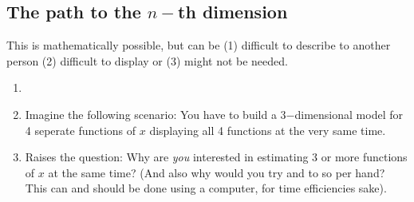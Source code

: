 \documentclass{article}
\begin{document}
\subsection{The path to the $n-$th dimension}
This is mathematically possible, but can be (1) difficult to describe to another person (2) difficult to display or (3) might not be needed.
\begin{enumerate}
    \item 
    \item Imagine the following scenario: You have to build a 3$-$dimensional model for 4 seperate functions of $x$ displaying all 4 functions at the very same time.
    \item Raises the question: Why are \textit{you} interested in estimating 3 or more functions of $x$ at the same time? (And also why would you try and to so per hand? This can and should be done using a computer, for time efficiencies sake). 
\end{enumerate}


\end{document}

